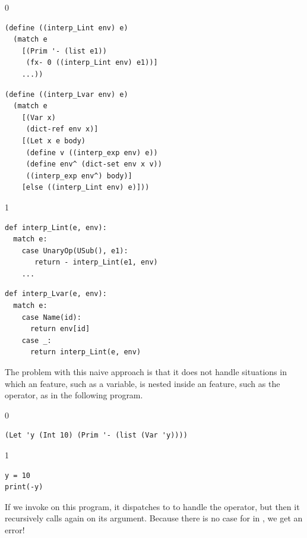 \documentclass[7x10]{TimesAPriori_MIT}%
\def\racketEd{0}
\def\pythonEd{1}
\def\edition{0}
\numberwithin{theorem}{chapter}
\numberwithin{definition}{chapter}
\numberwithin{equation}{chapter}
\begin{document}
\begin{center}
{\if\edition\racketEd  
\begin{minipage}{0.45\textwidth}
\begin{lstlisting}
(define ((interp_Lint env) e)
  (match e
    [(Prim '- (list e1))
     (fx- 0 ((interp_Lint env) e1))]
    ...))
\end{lstlisting}
\end{minipage}
\begin{minipage}{0.45\textwidth}
  \begin{lstlisting}
(define ((interp_Lvar env) e)
  (match e
    [(Var x)
     (dict-ref env x)]
    [(Let x e body)
     (define v ((interp_exp env) e))
     (define env^ (dict-set env x v))
     ((interp_exp env^) body)]
    [else ((interp_Lint env) e)]))    
\end{lstlisting}
\end{minipage}
\fi}

{\if\edition\pythonEd
\begin{minipage}{0.45\textwidth}
\begin{lstlisting}
def interp_Lint(e, env):
  match e:
    case UnaryOp(USub(), e1):
       return - interp_Lint(e1, env)
    ...
\end{lstlisting}
\end{minipage}
\begin{minipage}{0.45\textwidth}
\begin{lstlisting}
def interp_Lvar(e, env):
  match e:
    case Name(id):
      return env[id]
    case _:
      return interp_Lint(e, env)
\end{lstlisting}
\end{minipage}
\fi}
\end{center}
The problem with this naive approach is that it does not handle
situations in which an \LangVar{} feature, such as a variable, is
nested inside an \LangInt{} feature, such as the \code{-} operator, as
in the following program.
%
{\if\edition\racketEd
\begin{lstlisting}
(Let 'y (Int 10) (Prim '- (list (Var 'y))))
\end{lstlisting}
\fi}
{\if\edition\pythonEd
  \begin{lstlisting}
y = 10 
print(-y)
\end{lstlisting}
\fi}
%
\noindent If we invoke  on this program, it
dispatches to  to handle the \code{-} operator, but
then it recursively calls  again on its argument.
Because there is no case for  in , we get
an error!
\end{document}
